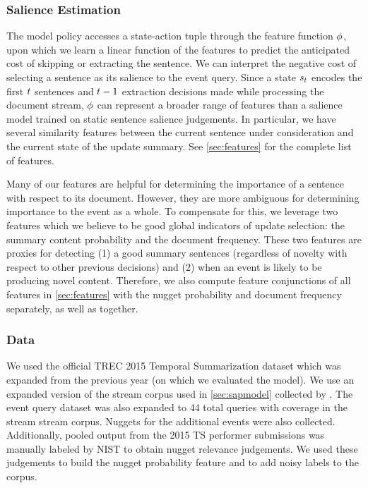 \subsubsection{Salience Estimation}
The model policy accesses a state-action tuple through the feature function 
$\phi$, upon which we learn a linear function of the features to predict 
the anticipated cost of skipping or extracting the sentence. We can interpret
the negative cost of selecting a sentence as its salience to the event
query. Since a
state $s_t$ encodes the first $t$ sentences and $t-1$
extraction decisions made while processing the document stream, $\phi$
can represent a broader range of features than a salience model trained 
on static sentence salience judgements. In particular, we have several
similarity features between the current sentence under consideration and
the current state of the update summary. See \autoref{sec:features} for the 
complete list of features. 

Many of our features are helpful for
 determining the importance of a sentence with respect to its document.
 However, they are more ambiguous for determining importance to the event as
 a whole. %
 To compensate for this, we
 leverage two features which we believe to be good global indicators of
 update selection: the summary content probability and the document
 frequency.  These two features are proxies for detecting (1) a good summary
 sentences (regardless of novelty with respect to other previous decisions)
 and (2) when an event is likely to be producing novel content. 
 Therefore, we also 
 compute
  feature conjunctions of all features in \autoref{sec:features} with the nugget 
 probability and document 
 frequency separately, as well as together.

\subsubsection{Data}
We used the official TREC 2015 Temporal Summarization dataset which 
was expanded from the previous year (on which we evaluated the \sap{} model).
We use an expanded version of the stream corpus used in \autoref{sec:sapmodel}
collected by \cite{frank2012building}. 
The event query dataset was also expanded to 44 total queries with coverage 
in the stream stream corpus. Nuggets for the additional events were also 
collected. Additionally, pooled output from the 2015 TS performer submissions
was manually labeled by NIST to obtain nugget relevance judgements. We used 
these judgements to build the nugget probability feature 
and to add noisy labels to the corpus.
 

